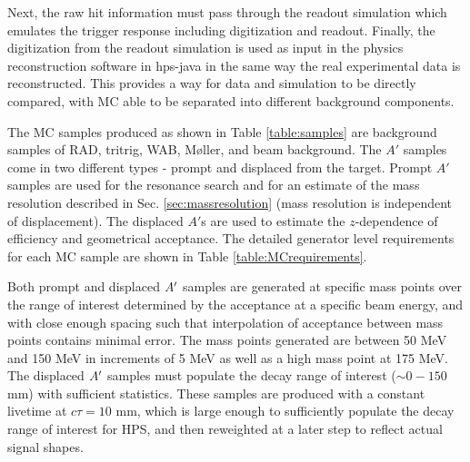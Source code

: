 Next, the raw hit information must pass through the readout simulation which emulates the trigger response including digitization and readout. Finally, the digitization from the readout simulation is used as input in the physics reconstruction software in hps-java in the same way the real experimental data is reconstructed. This provides a way for data and simulation to be directly compared, with MC able to be separated into different background components.

The MC samples produced as shown in Table \ref{table:samples} are background samples of RAD, tritrig, WAB, M\o ller, and beam background. The $A'$ samples come in two different types - prompt and displaced from the target. Prompt $A'$ samples are used for the resonance search and for an estimate of the mass resolution described in Sec. \ref{sec:massresolution} (mass resolution is independent of displacement). The displaced $A'$s are used to estimate the $z$-dependence of efficiency and geometrical acceptance. The detailed generator level requirements for each MC sample are shown in Table \ref{table:MCrequirements}.

Both prompt and displaced $A^\prime$ samples are generated at specific mass points over the range of interest determined by the acceptance at a specific beam energy, and with close enough spacing such that interpolation of acceptance between mass points contains minimal error. The mass points generated are between 50 MeV and 150 MeV in increments of 5 MeV as well as a high mass point at 175 MeV. The displaced $A^\prime$ samples must populate the decay range of interest ($\sim 0-150$ mm) with sufficient statistics. These samples are produced with a constant livetime at $c\tau=10$ mm, which is large enough to sufficiently populate the decay range of interest for HPS, and then reweighted at a later step to reflect actual signal shapes.


